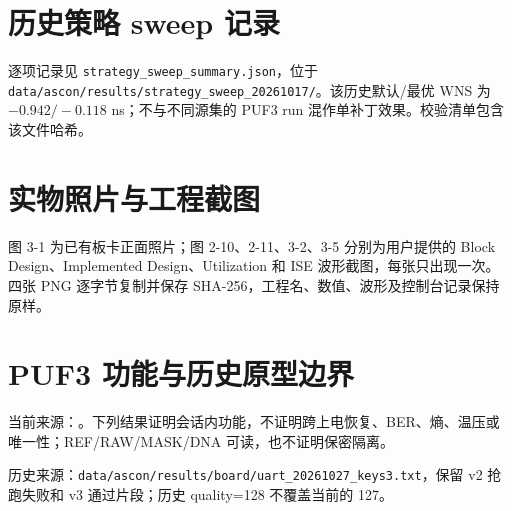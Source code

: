 \Needspace{85pt}
\section{历史策略 sweep 记录}
逐项记录见 \texttt{strategy\_sweep\_summary.json}，位于 \texttt{data/ascon/results/\allowbreak{}strategy\_sweep\_20261017/}。该历史默认/最优 WNS 为 $-0.942/-0.118$ ns；不与不同源集的 PUF3 run 混作单补丁效果。校验清单包含该文件哈希。

\Needspace{85pt}
\section{实物照片与工程截图}
图 3-1 为已有板卡正面照片；图 2-10、2-11、3-2、3-5 分别为用户提供的 Block Design、Implemented Design、Utilization 和 ISE 波形截图，每张只出现一次。四张 PNG 逐字节复制并保存 SHA-256，工程名、数值、波形及控制台记录保持原样。


\Needspace{85pt}
\section{PUF3 功能与历史原型边界}
当前来源：\pufresult。下列结果证明会话内功能，不证明跨上电恢复、BER、熵、温压或唯一性；REF/RAW/MASK/DNA 可读，也不证明保密隔离。

历史来源：\texttt{data/ascon/results/board/uart\_20261027\_keys3.txt}，保留 v2 抢跑失败和 v3 通过片段；历史 quality=128 不覆盖当前的 127。

